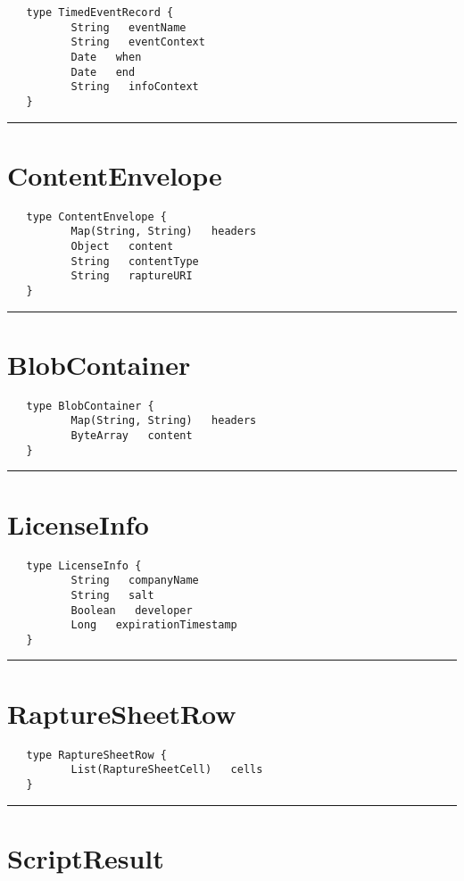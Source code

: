 \begin{verbatim}
   type TimedEventRecord {
          String   eventName
          String   eventContext
          Date   when
          Date   end
          String   infoContext
   }
\end{verbatim}

\rule{12cm}{2pt}
\section{ContentEnvelope}
\label{type:ContentEnvelope}

\begin{verbatim}
   type ContentEnvelope {
          Map(String, String)   headers
          Object   content
          String   contentType
          String   raptureURI
   }
\end{verbatim}

\rule{12cm}{2pt}
\section{BlobContainer}
\label{type:BlobContainer}

\begin{verbatim}
   type BlobContainer {
          Map(String, String)   headers
          ByteArray   content
   }
\end{verbatim}

\rule{12cm}{2pt}
\section{LicenseInfo}
\label{type:LicenseInfo}

\begin{verbatim}
   type LicenseInfo {
          String   companyName
          String   salt
          Boolean   developer
          Long   expirationTimestamp
   }
\end{verbatim}

\rule{12cm}{2pt}
\section{RaptureSheetRow}
\label{type:RaptureSheetRow}

\begin{verbatim}
   type RaptureSheetRow {
          List(RaptureSheetCell)   cells
   }
\end{verbatim}

\rule{12cm}{2pt}
\section{ScriptResult}
\label{type:ScriptResult}


